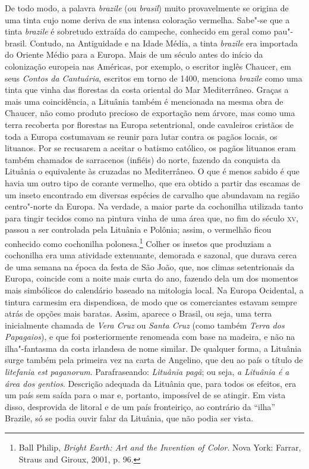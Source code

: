 De todo modo, a palavra \textit{brazile} (ou \textit{brasil}) muito
provavelmente se origina de uma tinta cujo nome deriva de sua intensa
coloração vermelha. Sabe"-se que a tinta \textit{brazile} é sobretudo
extraída do campeche, conhecido em geral como pau"-brasil. Contudo, na
Antiguidade e na Idade Média, a tinta \textit{brazile} era importada do
Oriente Médio para a Europa. Mais de um século antes do início da
colonização europeia nas Américas, por exemplo, o escritor inglês
Chaucer, em seus \textit{Contos da Cantuária}, escritos em torno de 1400,
menciona \textit{brazile} como uma tinta que vinha das florestas da costa
oriental do Mar Mediterrâneo. Graças a mais uma coincidência, a Lituânia
também é mencionada na mesma obra de Chaucer, não como produto precioso
de exportação nem árvore, mas como uma terra recoberta por florestas na
Europa setentrional, onde cavaleiros cristãos de toda a Europa
costumavam se reunir para lutar contra os pagãos locais, os lituanos.
Por se recusarem a aceitar o batismo católico, os pagãos lituanos eram
também chamados de sarracenos (infiéis) do norte, fazendo da conquista
da Lituânia o equivalente às cruzadas no Mediterrâneo. O que é menos
sabido é que havia um outro tipo de corante vermelho, que era obtido a
partir das escamas de um inseto encontrado em diversas espécies de
carvalho que abundavam na região centro"-norte da Europa. Na verdade, a
maior parte da cochonilha utilizada tanto para tingir tecidos como na
pintura vinha de uma área que, no fim do século \textsc{xv}, passou a ser
controlada pela Lituânia e Polônia; assim, o vermelhão ficou conhecido
como cochonilha polonesa.\footnote{Ball Philip, \textit{Bright Earth:
  Art and the Invention of Color}. Nova York: Farrar, Straus and Giroux,
  2001, p. 96.} Colher os insetos que produziam a cochonilha era uma
atividade extenuante, demorada e sazonal, que durava cerca de uma semana
na época da festa de São João, que, nos climas setentrionais da Europa,
coincide com a noite mais curta do ano, fazendo dela um dos momentos
mais simbólicos do calendário baseado na mitologia local. Na Europa
Ocidental, a tintura carmesim era dispendiosa, de modo que os
comerciantes estavam sempre atrás de opções mais baratas. Assim, aparece
o Brasil, ou seja, uma terra inicialmente chamada de \textit{Vera Cruz} ou
\textit{Santa Cruz} (como também \textit{Terra dos Papagaios}), e que foi
posteriormente renomeada com base na madeira, e não na ilha"-fantasma da
costa irlandesa de nome similar. De qualquer forma, a Lituânia surge
também pela primeira vez na carta de Angelino, que deu ao país o título
de \textit{litefania est paganorum}. Parafraseando: \textit{Lituânia
pagã}; ou seja, \textit{a Lituânia é a área dos gentios}. Descrição
adequada da Lituânia que, para todos os efeitos, era um país sem saída
para o mar e, portanto, impossível de se atingir. Em vista disso,
desprovida de litoral e de um país fronteiriço, ao contrário da ``ilha''
Brazile, só se podia ouvir falar da Lituânia, que não podia ser vista.

